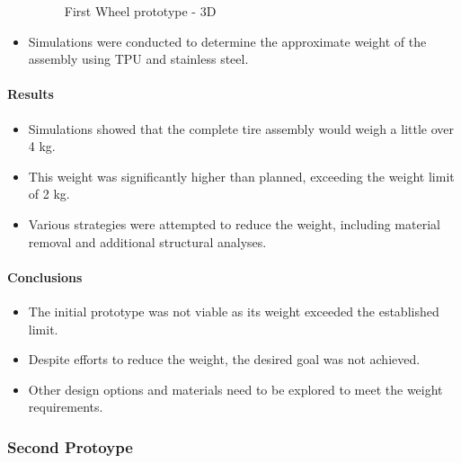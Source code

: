 \documentclass{article}
\begin{document}
\begin{itemize}
\begin{figure}[H]
\begin{subfigure}{.5\textwidth}
        \end{subfigure}
        \caption{First Wheel prototype - 3D}
        
        \end{figure}
    \item Simulations were conducted to determine the approximate weight of the assembly using TPU and stainless steel.
\end{itemize}
\paragraph[short]{Results}
\begin{itemize}
    \item Simulations showed that the complete tire assembly would weigh a little over 4 kg.
    \item This weight was significantly higher than planned, exceeding the weight limit of 2 kg.
    \item Various strategies were attempted to reduce the weight, including material removal and additional structural analyses.
\end{itemize}

\paragraph[short]{Conclusions}
\begin{itemize}
    \item The initial prototype was not viable as its weight exceeded the established limit.
    \item Despite efforts to reduce the weight, the desired goal was not achieved.
    \item Other design options and materials need to be explored to meet the weight requirements.
\end{itemize}

\subsubsection{Second Protoype}
\end{document}
